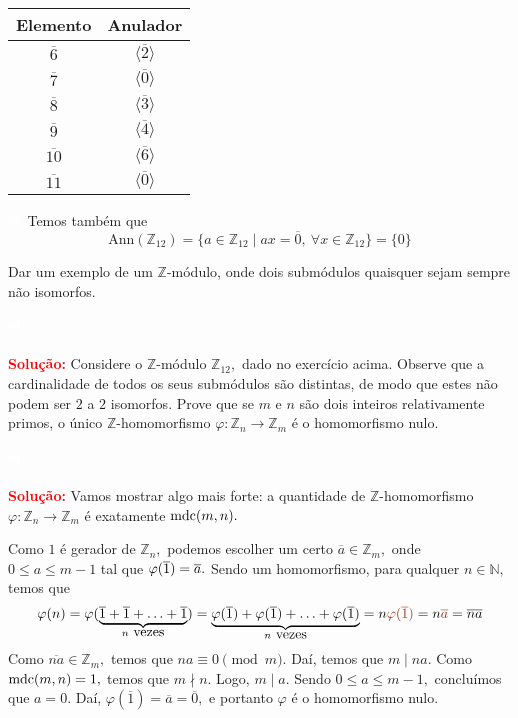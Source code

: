 \documentclass[11pt,a4paper]{article}
\newcounter{exercicio}[section]
\newcommand{\solucao}[1]{
\textbf{\textcolor{white}{oi}\\ \\ \textcolor{red}{Solução:}} #1}
\begin{document}
{\begin{minipage}{.5\textwidth}
\end{minipage} 
\begin{minipage}{.5\textwidth}
\centering
\begin{tabular}{|c|c|}
\toprule
Elemento & Anulador \\ \hline
$\overline{6}$ & $\langle \overline{2} \rangle$ \\\hline
$\overline{7}$ & $\langle \overline{0} \rangle$ \\\hline
$\overline{8}$ & $\langle \overline{3} \rangle$ \\\hline
$\overline{9}$ & $\langle \overline{4} \rangle$ \\\hline
$\overline{10}$ & $\langle \overline{6} \rangle$ \\\hline
$\overline{11}$ & $\langle \overline{0} \rangle$ \\ \hline
\end{tabular}
  
\end{minipage} 


\noindent\newline\textcolor{white}{Oi}\newline
Temos também que
\[
\mbox{Ann}(\mathbb{Z}_{12}) = \{ a \in \mathbb{Z}_{12} \mid ax = \overline{0}, \ \forall x \in \mathbb{Z}_{12} \} = \{ 0 \}
\]
}
 Dar um exemplo de um $\mathbb{Z}$-módulo, onde dois submódulos quaisquer sejam sempre não isomorfos.
\solucao{Considere o $\mathbb{Z}$-módulo $\mathbb{Z}_{12},$ dado no exercício acima. Observe que a cardinalidade de todos os seus submódulos são distintas, de modo que estes não podem ser $2$ a $2$ isomorfos.}
 Prove que se $m$ e $n$ são dois inteiros relativamente primos, o único $\mathbb{Z}$-homomorfismo $\varphi \colon \mathbb{Z}_n \to \mathbb{Z}_m$ é
o homomorfismo nulo.
\solucao{
Vamos mostrar algo mais forte: a quantidade de $\mathbb{Z}$-homomorfismo $\varphi \colon \mathbb{Z}_n \to \mathbb{Z}_m$ é exatamente ${\rm mdc}(m,n).$ 

Como $1$ é gerador de $\mathbb{Z}_n,$ podemos escolher um certo $\overline{a} \in \mathbb{Z}_m,$ onde $0 \le a \le m-1$ tal que $\varphi(\overline{1}) = \overline{a}.$ Sendo um homomorfismo, para qualquer $n \in \mathbb{N},$ temos que
\[
\varphi(n) = \varphi(\underbrace{\ovelrine{1} + \ovelrine{1} + \ldots + \ovelrine{1}}_{n \mbox{ vezes}}) = \underbrace{\varphi(\ovelrine{1}) + \varphi(\ovelrine{1}) + \ldots + \varphi(\ovelrine{1})}_{n \mbox{ vezes}} =n \textcolor{RawSienna}{\varphi(\overline{1})} =n \textcolor{RawSienna}{\overline{a}} = \overline{na}
\]
Como $\overline{na} \in \mathbb{Z}_m,$ temos que $na \equiv 0 \pmod m.$ Daí, temos que $m \mid na.$ Como ${\rm mdc}(m,n) = 1,$ temos que $m \nmid n.$ Logo, $m \mid a.$ Sendo $0 \le a \le m-1,$ concluímos que $a = 0.$ Daí, $\varphi(\overline{1}) = \overline{a} = \overline{0},$ e portanto $\varphi$ é o homomorfismo nulo.





}
\end{document}
